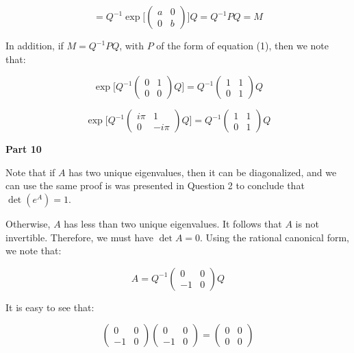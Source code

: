 \documentclass[10pt, oneside]{article}
\begin{document}
    $$ = Q^{-1} \exp \Big[ \begin{pmatrix} a & 0 \\ 0 & b \end{pmatrix} \Big] Q = Q^{-1} P Q = M$$

    In addition, if $M = Q^{-1} P Q$, with $P$ of the form of equation (1), then we note that:

    $$\exp \Big[ Q^{-1} \begin{pmatrix} 0 & 1 \\ 0 & 0 \end{pmatrix} Q \Big] = Q^{-1} \begin{pmatrix} 1 & 1 \\ 0 & 1 \end{pmatrix} Q$$

    $$\exp \Big[ Q^{-1} \begin{pmatrix} i\pi & 1 \\ 0 & -i\pi \end{pmatrix} Q \Big] = Q^{-1} \begin{pmatrix} 1 & 1 \\ 0 & 1 \end{pmatrix} Q$$

    \textbf{Part 10}
    \newline

    Note that if $A$ has two unique eigenvalues, then it can be diagonalized, and we can use the same proof is was presented in Question 2 to conclude that $\det(e^A) = 1$.
    \newline

    Otherwise, $A$ has less than two unique eigenvalues. It follows that $A$ is not invertible. Therefore, we must have $\det A = 0$. Using the rational canonical form, we note that:

    $$A = Q^{-1} \begin{pmatrix} 0 & 0 \\ -1 & 0 \end{pmatrix} Q$$

    It is easy to see that:

    $$\begin{pmatrix} 0 & 0 \\ -1 & 0 \end{pmatrix} \begin{pmatrix} 0 & 0 \\ -1 & 0 \end{pmatrix} = \begin{pmatrix} 0 & 0 \\ 0 & 0 \end{pmatrix}$$
\end{document}
